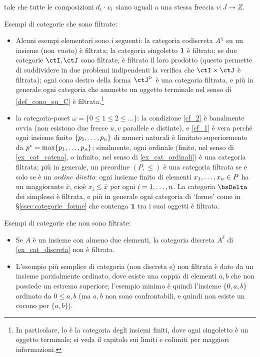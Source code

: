 tale che tutte le composizioni \(d_i\cdot v_i\) siano uguali a una stessa freccia \(v \colon J\to Z\).
\begin{examples}\label{contro_esempi_filt}
 Esempi di categorie che sono filtrate:
 \begin{itemize}
  \item Alcuni esempi elementari sono i seguenti: la categoria codiscreta \(A^\chi\) su un insieme (non vuoto) è filtrata; la categoria singoletto \(\mathbf{1}\) è filtrata; se due categorie \(\ctI,\ctJ\) sono filtrate, è filtrato il loro prodotto (questo permette di suddividere in due problemi indipendenti la verifica che \(\ctI\times\ctJ\) è filtrata); ogni cono destro della forma \(\ctJ^\rhd\) è una categoria filtrata, e più in generale ogni categoria che ammette un oggetto terminale nel senso di \ref{def_cono_su_C} è filtrata.\footnote{In particolare, lo è la categoria degli insiemi finiti, dove ogni singoletto è un oggetto terminale; si veda il capitolo sui limiti e colimiti per maggiori informazioni.}
  \item la categoria-poset \(\omega=\{0\le 1\le 2\le\dots\}\): la condizione \ref{cf_2} è banalmente ovvia (non esistono due frecce \(u,v\) parallele e distinte), e \ref{cf_1} è vera perché ogni insieme finito \(\{\tup pn,\}\) di numeri naturali è limitato superiormente da \(p^*=\max\{\tup pn,\}\); similmente, ogni ordinale (finito, nel senso di \ref{ex_cat_catena}, o infinito, nel senso di \ref{ex_cat_ordinali}) è una categoria filtrata; più in generale, un preordine \((P,\le)\) è una categoria filtrata se e solo se è un \emph{ordine diretto}: ogni insieme finito di elementi \(\tup xn, \in P\) ha un maggiorante \(\bar x\), cioè \(x_i\le \bar x\) per ogni \(i=\iter n\). La categoria \(\bsDelta\) dei simplessi è filtrata, e più in generale ogni categoria di `forme' come in §\ref{ssec:categorie_forme} che contenga \(\mathbf{1}\) tra i suoi oggetti è filtrata.
 \end{itemize}
 Esempi di categorie che non sono filtrate:
 \begin{itemize}
  \item Se \(A\) è un insieme con almeno due elementi, la categoria discreta \(A^\delta\) di \ref{ex_cat_discreta} non è filtrata.
  \item L'esempio più semplice di categoria (non discreta e) non filtrata è dato da un insieme parzialmente ordinato, dove esiste una coppia di elementi \(a,b\) che non possiede un estremo superiore; l'esempio minimo è quindi l'insieme \(\{0,a,b\}\) ordinato da \(0\le a,b\) (ma \(a,b\) non sono confrontabili, e quindi non esiste un cocono per \(\{a,b\}\)).

\end{itemize}
\end{examples}
